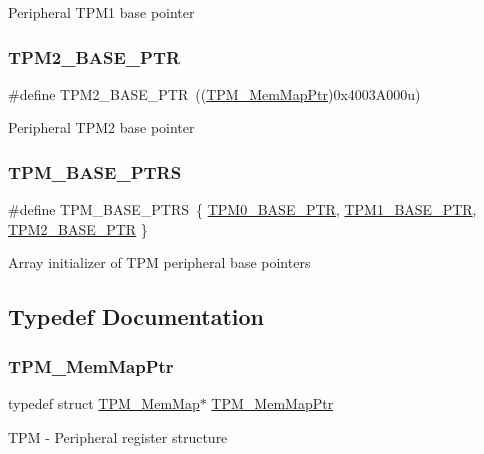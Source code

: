 Peripheral T\+P\+M1 base pointer \mbox{\label{group___t_p_m___peripheral_ga37cc120e7475fb646fe9bc15b57f06bc}} 
\subsubsection{\texorpdfstring{T\+P\+M2\+\_\+\+B\+A\+S\+E\+\_\+\+P\+TR}{TPM2\_BASE\_PTR}}
{\footnotesize\ttfamily \#define T\+P\+M2\+\_\+\+B\+A\+S\+E\+\_\+\+P\+TR~((\hyperlink{group___t_p_m___peripheral_ga32147338cedc9904efff0d19b3a358ac}{T\+P\+M\+\_\+\+Mem\+Map\+Ptr})0x4003\+A000u)}

Peripheral T\+P\+M2 base pointer \mbox{\label{group___t_p_m___peripheral_ga1d61ed554c056d8f63d1dbcc7ce05e62}} 
\subsubsection{\texorpdfstring{T\+P\+M\+\_\+\+B\+A\+S\+E\+\_\+\+P\+T\+RS}{TPM\_BASE\_PTRS}}
{\footnotesize\ttfamily \#define T\+P\+M\+\_\+\+B\+A\+S\+E\+\_\+\+P\+T\+RS~\{ \hyperlink{group___t_p_m___peripheral_ga8ba6c6fb69345639750108c3289a24c4}{T\+P\+M0\+\_\+\+B\+A\+S\+E\+\_\+\+P\+TR}, \hyperlink{group___t_p_m___peripheral_ga3c3f533f8c87c74f2bbc3a4de83d1181}{T\+P\+M1\+\_\+\+B\+A\+S\+E\+\_\+\+P\+TR}, \hyperlink{group___t_p_m___peripheral_ga37cc120e7475fb646fe9bc15b57f06bc}{T\+P\+M2\+\_\+\+B\+A\+S\+E\+\_\+\+P\+TR} \}}

Array initializer of T\+PM peripheral base pointers 

\subsection{Typedef Documentation}
\mbox{\label{group___t_p_m___peripheral_ga32147338cedc9904efff0d19b3a358ac}} 
\subsubsection{\texorpdfstring{T\+P\+M\+\_\+\+Mem\+Map\+Ptr}{TPM\_MemMapPtr}}
{\footnotesize\ttfamily typedef struct \hyperlink{struct_t_p_m___mem_map}{T\+P\+M\+\_\+\+Mem\+Map}$\ast$ \hyperlink{group___t_p_m___peripheral_ga32147338cedc9904efff0d19b3a358ac}{T\+P\+M\+\_\+\+Mem\+Map\+Ptr}}

T\+PM -\/ Peripheral register structure 